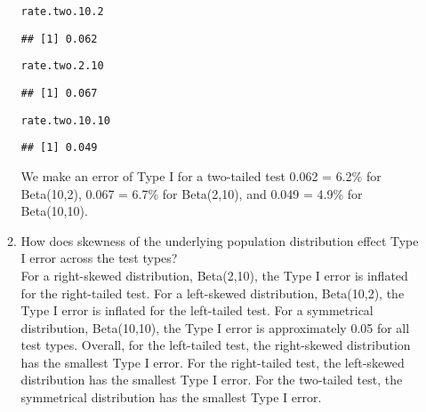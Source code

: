 \documentclass{article}\usepackage[]{graphicx}\usepackage[]{xcolor}
\makeatletter
\newcommand{\hldef}[1]{\textcolor[rgb]{0.345,0.345,0.345}{#1}}%
\newenvironment{kframe}{%
 \def\at@end@of@kframe{}%
 \ifinner\ifhmode%
  \def\at@end@of@kframe{\end{minipage}}%
  \begin{minipage}{\columnwidth}%
 \fi\fi%
 \def\FrameCommand##1{\hskip\@totalleftmargin \hskip-\fboxsep
 \colorbox{shadecolor}{##1}\hskip-\fboxsep
     \hskip-\linewidth \hskip-\@totalleftmargin \hskip\columnwidth}%
 \MakeFramed {\advance\hsize-\width
   \@totalleftmargin\z@ \linewidth\hsize
   \@setminipage}}%
 {\par\unskip\endMakeFramed%
 \at@end@of@kframe}
\newenvironment{knitrout}{}{} %
\makeatother
\begin{document}
\begin{enumerate}
\begin{enumerate}
\begin{knitrout}
\begin{kframe}
\begin{alltt}
\hldef{rate.two.10.2}
\end{alltt}
\begin{verbatim}
## [1] 0.062
\end{verbatim}
\begin{alltt}
\hldef{rate.two.2.10}
\end{alltt}
\begin{verbatim}
## [1] 0.067
\end{verbatim}
\begin{alltt}
\hldef{rate.two.10.10}
\end{alltt}
\begin{verbatim}
## [1] 0.049
\end{verbatim}
\end{kframe}
\end{knitrout}
We make an error of Type I for a two-tailed test 0.062 = 6.2\% for Beta(10,2),  0.067 = 6.7\% for Beta(2,10), and 0.049 = 4.9\% for Beta(10,10).
    \item How does skewness of the underlying population distribution effect
    Type I error across the test types? \\
    For a right-skewed distribution, Beta(2,10), the Type I error is inflated for the right-tailed test. For a left-skewed distribution, Beta(10,2), the Type I error is inflated for the left-tailed test. For a symmetrical distribution, Beta(10,10), the Type I error is approximately 0.05 for all test types.
    Overall, for the left-tailed test, the right-skewed distribution has the smallest Type I error. For the right-tailed test, the left-skewed distribution has the smallest Type I error. For the two-tailed test, the symmetrical distribution has the smallest Type I error.  
  \end{enumerate}
\end{enumerate}

\end{document}
